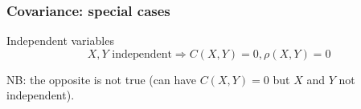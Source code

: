 \documentclass[9pt]{beamer}
\newif\ifmynote
\newcommand\mynote[1]{%
\ifmynote \textbf{#1} \else \fi
}
\begin{document}
\begin{frame}
 \frametitle{Covariance: special cases}
 
 \mynote{Écrire au tableau}
 
 \begin{block}{Independent variables}
  $$X,Y \text{ independent} \Rightarrow C(X,Y) =0, \rho(X,Y) = 0$$
  
  NB: the opposite is not true (can have $C(X,Y)=0$ but $X$ and $Y$ not independent).
 \end{block}
 
\end{frame}
\end{document}
